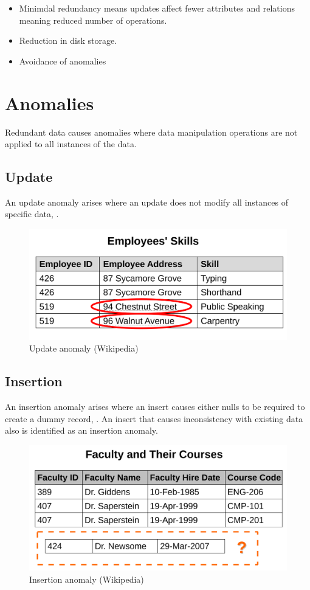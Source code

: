 \begin{itemize}
\item
  Minimdal redundancy means updates affect fewer attributes and
  relations meaning reduced number of operations.
\item
  Reduction in disk storage.
\item
  Avoidance of anomalies
\end{itemize}

\newpage
\section{Anomalies}\label{anomalies}

Redundant data causes anomalies where data manipulation operations are
not applied to all instances of the data.

\subsection{Update}\label{update}

An update anomaly arises where an update does not modify all instances
of specific data, .

\begin{figure}[htbp]
\centering
\includegraphics[width=0.5\linewidth]{update_anomaly}
\caption{Update anomaly (Wikipedia){}}
\end{figure}

\subsection{Insertion}\label{insertion}

An insertion anomaly arises where an insert causes either nulls to be
required to create a dummy record, .
An insert that causes inconsistency with existing data also is
identified as an insertion anomaly.

\begin{figure}[htbp]
\centering
\includegraphics[width=0.5\linewidth]{insertion_anomaly}
\caption{Insertion anomaly (Wikipedia){}}
\end{figure}


